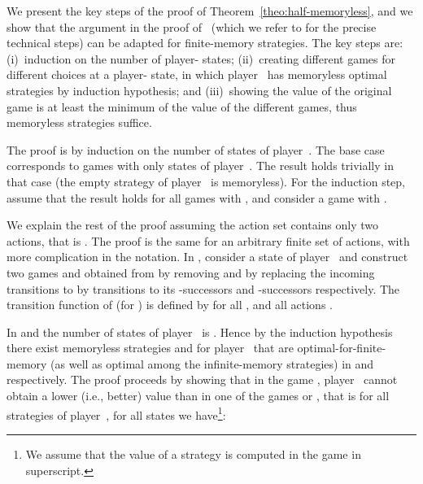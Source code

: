 \documentclass{article}
\begin{document}
\smallskip{}
We present the key steps of the proof of Theorem~\ref{theo:half-memoryless}, 
and we show that the argument in the proof of~\cite[Theorem~5.2]{GK14} (which we refer to 
for the precise technical steps) can be adapted for finite-memory strategies.
The key steps are: 
(i)~induction on the number of player- states;
(ii)~creating different games for different choices at a player- state, in which
player~ has memoryless optimal strategies by induction hypothesis;
and (iii)~showing the value of the original game is at least the minimum of the 
value of the different games, thus memoryless strategies suffice.

\smallskip{}
The proof is by induction on the number of states of player~. The base case
 corresponds to games with only states of player~. 
The result holds trivially in that case (the empty strategy of player~ 
is memoryless). For the induction step, assume that the result holds for all games
with , and consider a game  with . 

\smallskip{}
We explain the rest of the proof assuming the action set contains only two actions, 
that is . The proof is the same for an arbitrary finite set of actions, 
with more complication in the notation. 
In , consider a state  of player~ and construct
two games  and  obtained from  by removing  and by
replacing the incoming transitions to  by transitions to its -successors
and -successors respectively. The transition function of  (for )
is defined by 
for all , and all actions .

\smallskip{}
In  and  the number of states of player~ is . 
Hence by the induction hypothesis there exist memoryless strategies  and 
for player~ that are optimal-for-finite-memory (as well as optimal among the infinite-memory strategies) 
in  and  respectively.
The proof proceeds by showing that in the game , player~ cannot obtain
a lower (i.e., better) value than in one of the games  or ,
that is for all strategies  of player~, for all states 
we have\footnote{We assume that the value  of 
a strategy  is computed in the game  in superscript.}:
\end{document}
